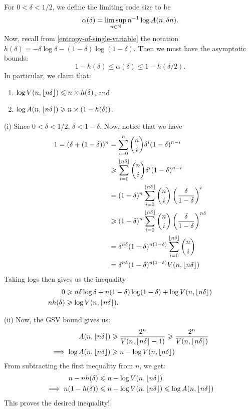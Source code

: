 \documentclass{article}
\begin{document}
\begin{proposition}
	\label{asymptotic-gsv}
    For $0 < \delta < 1/2$, we define the limiting code size to be
    \[
	\alpha(\delta) = \limsup_{n \in \mathbb{N}} n^{-1} \log A(n, \delta n).
	\]
	Now, recall from \ref{entropy-of-single-variable}
	the notation $h(\delta) = -\delta \log \delta - (1-\delta)\log(1-\delta)$.
	Then we must have the asymptotic bounds:
    \[
	1 - h(\delta) \leq \alpha(\delta) \leq 1 - h(\delta/2).
	\]
	In particular, we claim that:
	
	\begin{enumerate}
    	\item[(i)] $\log V(n, \left\lfloor n\delta\right\rfloor) \leqslant n \times h(\delta)$, and
    	\item[(ii)] $\log A(n, \left\lfloor n\delta\right\rfloor) \geqslant n \times (1- h(\delta))$.
	\end{enumerate}
\end{proposition}

\begin{prf}
	(i) Since $0 < \delta < 1/2$, $\delta < 1-\delta$. Now, notice that we have
	\begin{align*}
    	1 = (\delta + (1 - \delta))^n &= \sum_{i=0}^n \binom n i \delta^i (1-\delta)^{n-i} \\
    	&\geqslant \sum_{i=0}^{\left\lfloor n \delta\right\rfloor} \binom n i \delta^i (1-\delta)^{n-i} \\
    	&= (1-\delta)^n \sum_{i=0}^{\left\lfloor n \delta\right\rfloor} \binom n i \left( \frac{\delta}{1-\delta} \right)^i \\
		&\geqslant (1-\delta)^n \sum_{i=0}^{\left\lfloor n \delta\right\rfloor} \binom n i \left( \frac{\delta}{1-\delta} \right)^{n \delta} \\
		&= \delta^{n\delta}(1-\delta)^{n(1-\delta)} \sum_{i=0}^{\left\lfloor n \delta\right\rfloor} \binom n i \\
		&= \delta^{n\delta}(1-\delta)^{n(1-\delta)} V(n, \left\lfloor n\delta\right\rfloor)
	\end{align*}
	Taking logs then gives us the inequality
	\begin{align*}
    	0 &\geqslant n\delta \log \delta + n(1-\delta) \log (1-\delta) + \log V(n, \left\lfloor n\delta\right\rfloor) \\
    	nh(\delta) &\geqslant \log V(n, \left\lfloor n\delta\right\rfloor).
	\end{align*}

    (ii) Now, the GSV bound gives us:
	\begin{align*}
    	A(n, \left\lfloor n \delta\right\rfloor) &\geqslant \frac{2^n}{V(n, \left\lfloor n \delta\right\rfloor - 1)} \geqslant \frac{2^n}{V(n, \left\lfloor n \delta\right\rfloor)} \\
    	\implies	 \log A(n, \left\lfloor n\delta\right\rfloor) &\geqslant n - \log V(n, \left\lfloor n \delta\right\rfloor)
	\end{align*}
	From subtracting the first inequality from $n$, we get:
	\begin{align*}
    	n - nh(\delta) &\leqslant n - \log V(n, \left\lfloor n\delta\right\rfloor) \\
    	\implies n(1- h(\delta)) &\leqslant n - \log V(n, \left\lfloor n\delta\right\rfloor) \leqslant \log A(n, \left\lfloor n\delta\right\rfloor)
	\end{align*}
	This proves the desired inequality!
\end{prf}
\end{document}
